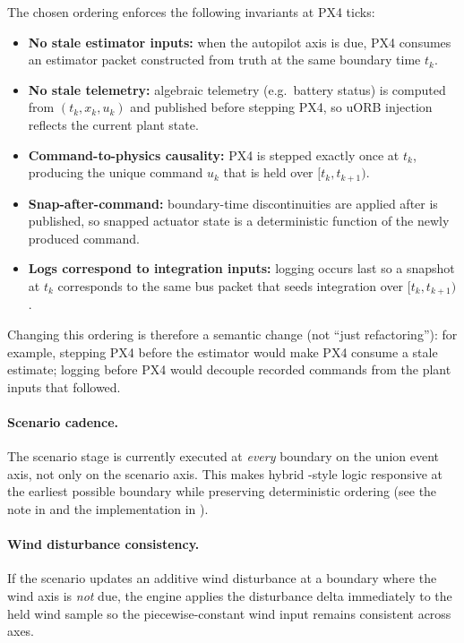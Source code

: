 The chosen ordering enforces the following invariants at PX4 ticks:
\begin{itemize}[leftmargin=*,itemsep=2pt]
  \item \textbf{No stale estimator inputs:} when the autopilot axis is due, PX4 consumes an estimator packet constructed from truth at the same boundary time \(t_k\).
  \item \textbf{No stale telemetry:} algebraic telemetry (e.g.\ battery status) is computed from \((t_k,x_k,u_k)\) and published before stepping PX4, so uORB injection reflects the current plant state.
  \item \textbf{Command-to-physics causality:} PX4 is stepped exactly once at \(t_k\), producing the unique command \(u_k\) that is held over \([t_k,t_{k+1})\).
  \item \textbf{Snap-after-command:} boundary-time discontinuities are applied after  is published, so snapped actuator state is a deterministic function of the newly produced command.
  \item \textbf{Logs correspond to integration inputs:} logging occurs last so a snapshot at \(t_k\) corresponds to the same bus packet that seeds integration over \([t_k,t_{k+1})\).
\end{itemize}

Changing this ordering is therefore a semantic change (not ``just refactoring''): for example, stepping PX4 before the estimator would make PX4 consume a stale estimate; logging before PX4 would decouple recorded commands from the plant inputs that followed.

\paragraph{Scenario cadence.}
The scenario stage is currently executed at \emph{every} boundary on the union event axis, not only on the scenario axis. This makes hybrid -style logic responsive at the earliest possible boundary while preserving deterministic ordering (see the note in  and the implementation in ).

\paragraph{Wind disturbance consistency.}
If the scenario updates an additive wind disturbance at a boundary where the wind axis is \emph{not} due, the engine applies the disturbance delta immediately to the held wind sample so the piecewise-constant wind input remains consistent across axes.

